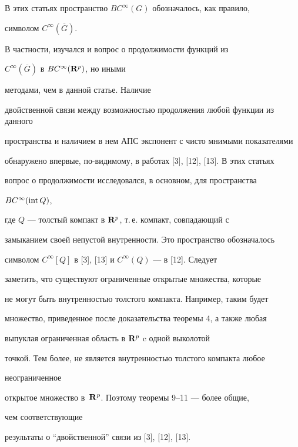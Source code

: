 В этих статьях пространство $BC^{\infty}(G)$ обозначалось, как правило,


символом $C^{\infty}(\overline{G})$.





В частности, изучался и вопрос о продолжимости функций из


$C^{\infty}(\overline{G})$ в $BC^{\infty}({\bold R}^p)$, но иными 


методами, чем в данной статье. Наличие


двойственной связи между возможностью продолжения любой функции из данного


пространства и наличием в нем АПС экспонент с чисто мнимыми показателями


обнаружено впервые, по-видимому, в работах [3], [12], [13]. В этих статьях


вопрос о продолжимости исследовался, в основном, для пространства


$BC^{\infty}(\operatorname{int} Q)$,


где $Q$ --- толстый компакт в ${\bold R}^p$, т.\,е. компакт, совпадающий с


замыканием своей непустой внутренности. Это пространство обозначалось 


символом $C^{\infty}[Q]$ в [3], [13] и $C^{\infty}(Q)$ --- в [12]. Следует


заметить, что существуют ограниченные открытые множества, которые 


не могут быть внутренностью толстого компакта. Например, таким будет 


множество, приведенное после доказательства теоремы 4, а также любая 


выпуклая ограниченная область в ${\bold R}^p$ c одной выколотой


точкой. Тем более, не является внутренностью толстого компакта любое


неограниченное


открытое множество в~${\bold R}^p$. Поэтому теоремы 9--11 --- более общие,


чем соответствующие


результаты о ``двойственной''  связи из [3], [12], [13].











